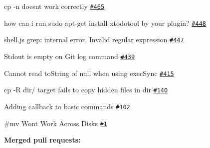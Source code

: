 \begin{DoxyItemize}
\item cp -\/n doesn\textquotesingle{}t work correctly \href{https://github.com/shelljs/shelljs/issues/465}{\tt \#465}
\item how can i run sudo apt-\/get install xtodotool by your plugin? \href{https://github.com/shelljs/shelljs/issues/448}{\tt \#448}
\item shell.\+js grep\+: internal error, Invalid regular expression \href{https://github.com/shelljs/shelljs/issues/447}{\tt \#447}
\item Stdout is empty on Git log command \href{https://github.com/shelljs/shelljs/issues/439}{\tt \#439}
\item Cannot read to\+String of null when using exec\+Sync \href{https://github.com/shelljs/shelljs/issues/415}{\tt \#415}
\item cp -\/R dir/ target fails to copy hidden files in dir \href{https://github.com/shelljs/shelljs/issues/140}{\tt \#140}
\item Adding callback to basic commands \href{https://github.com/shelljs/shelljs/issues/102}{\tt \#102}
\item \#mv Won\textquotesingle{}t Work Across Disks \href{https://github.com/shelljs/shelljs/issues/1}{\tt \#1}
\end{DoxyItemize}

{\bfseries Merged pull requests\+:}


